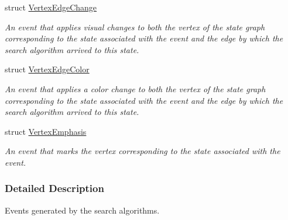 \begin{DoxyCompactItemize}
struct \hyperlink{structslb_1_1ext_1_1event_1_1VertexEdgeChange}{Vertex\+Edge\+Change}
\begin{DoxyCompactList}\small\item\em An event that applies visual changes to both the vertex of the state graph corresponding to the state associated with the event and the edge by which the search algorithm arrived to this state. \end{DoxyCompactList}\item 
struct \hyperlink{structslb_1_1ext_1_1event_1_1VertexEdgeColor}{Vertex\+Edge\+Color}
\begin{DoxyCompactList}\small\item\em An event that applies a color change to both the vertex of the state graph corresponding to the state associated with the event and the edge by which the search algorithm arrived to this state. \end{DoxyCompactList}\item 
struct \hyperlink{structslb_1_1ext_1_1event_1_1VertexEmphasis}{Vertex\+Emphasis}
\begin{DoxyCompactList}\small\item\em An event that marks the vertex corresponding to the state associated with the event. \end{DoxyCompactList}\end{DoxyCompactItemize}


\subsubsection{Detailed Description}
Events generated by the search algorithms. 